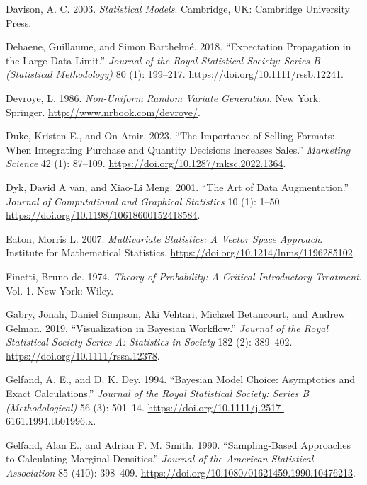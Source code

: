 \documentclass[
  11pt,
  letterpaper,
]{scrbook}
\newlength{\cslhangindent}
\newenvironment{CSLReferences}[2] %
 {\begin{list}{}{%
  \setlength{\itemindent}{0pt}
  \setlength{\leftmargin}{0pt}
  \setlength{\parsep}{0pt}
  \ifodd #1
   \setlength{\leftmargin}{\cslhangindent}
   \setlength{\itemindent}{-1\cslhangindent}
  \fi
  \setlength{\itemsep}{#2\baselineskip}}}
 {\end{list}}
\theoremstyle{definition}
\theoremstyle{plain}
\theoremstyle{plain}
\theoremstyle{plain}
\theoremstyle{definition}
\theoremstyle{definition}
\theoremstyle{remark}
\begin{document}
\begin{CSLReferences}{1}{0}
Davison, A. C. 2003. \emph{Statistical Models}. Cambridge, UK: Cambridge
University Press.

Dehaene, Guillaume, and Simon Barthelmé. 2018. {``Expectation
Propagation in the Large Data Limit.''} \emph{Journal of the Royal
Statistical Society: Series B (Statistical Methodology)} 80 (1):
199--217. \url{https://doi.org/10.1111/rssb.12241}.

Devroye, L. 1986. \emph{Non-Uniform Random Variate Generation}. New
York: Springer. \url{http://www.nrbook.com/devroye/}.

Duke, Kristen E., and On Amir. 2023. {``The Importance of Selling
Formats: When Integrating Purchase and Quantity Decisions Increases
Sales.''} \emph{Marketing Science} 42 (1): 87--109.
\url{https://doi.org/10.1287/mksc.2022.1364}.

Dyk, David A van, and Xiao-Li Meng. 2001. {``The Art of Data
Augmentation.''} \emph{Journal of Computational and Graphical
Statistics} 10 (1): 1--50.
\url{https://doi.org/10.1198/10618600152418584}.

Eaton, Morris L. 2007. \emph{Multivariate Statistics: A Vector Space
Approach}. Institute for Mathematical Statistics.
\url{https://doi.org/10.1214/lnms/1196285102}.

Finetti, Bruno de. 1974. \emph{Theory of Probability: A Critical
Introductory Treatment}. Vol. 1. New York: Wiley.

Gabry, Jonah, Daniel Simpson, Aki Vehtari, Michael Betancourt, and
Andrew Gelman. 2019. {``{Visualization in {B}ayesian Workflow}.''}
\emph{Journal of the Royal Statistical Society Series A: Statistics in
Society} 182 (2): 389--402. \url{https://doi.org/10.1111/rssa.12378}.

Gelfand, A. E., and D. K. Dey. 1994. {``Bayesian Model Choice:
Asymptotics and Exact Calculations.''} \emph{Journal of the Royal
Statistical Society: Series B (Methodological)} 56 (3): 501--14.
\url{https://doi.org/10.1111/j.2517-6161.1994.tb01996.x}.

Gelfand, Alan E., and Adrian F. M. Smith. 1990. {``Sampling-Based
Approaches to Calculating Marginal Densities.''} \emph{Journal of the
American Statistical Association} 85 (410): 398--409.
\url{https://doi.org/10.1080/01621459.1990.10476213}.


\end{CSLReferences}
\end{document}
